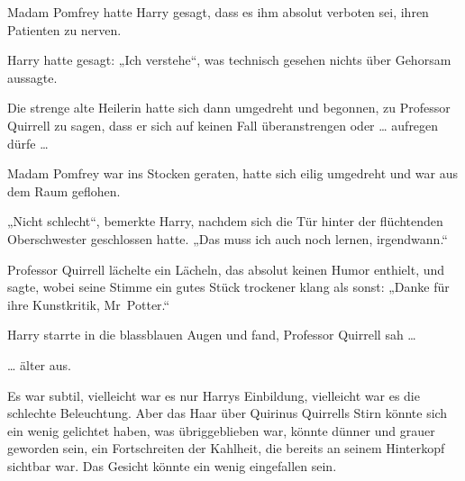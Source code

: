 Madam Pomfrey hatte Harry gesagt, dass es ihm absolut verboten sei, ihren Patienten zu nerven.

Harry hatte gesagt:
„Ich verstehe“, was technisch gesehen nichts über Gehorsam aussagte.

Die strenge alte Heilerin hatte sich dann umgedreht und begonnen, zu Professor Quirrell zu sagen, dass er sich auf keinen Fall überanstrengen oder … aufregen dürfe …

Madam Pomfrey war ins Stocken geraten, hatte sich eilig umgedreht und war aus dem Raum geflohen.

„Nicht schlecht“, bemerkte Harry, nachdem sich die Tür hinter der flüchtenden Oberschwester geschlossen hatte.
„Das muss ich auch noch lernen, irgendwann.“

Professor Quirrell lächelte ein Lächeln, das absolut keinen Humor enthielt, und sagte, wobei seine Stimme ein gutes Stück trockener klang als sonst:
„Danke für ihre Kunstkritik, Mr~Potter.“

Harry starrte in die blassblauen Augen und fand, Professor Quirrell sah …

… älter aus.

Es war subtil, vielleicht war es nur Harrys Einbildung, vielleicht war es die schlechte Beleuchtung. Aber das Haar über Quirinus Quirrells Stirn könnte sich ein wenig gelichtet haben, was übriggeblieben war, könnte dünner und grauer geworden sein, ein Fortschreiten der Kahlheit, die bereits an seinem Hinterkopf sichtbar war. Das Gesicht könnte ein wenig eingefallen sein.

